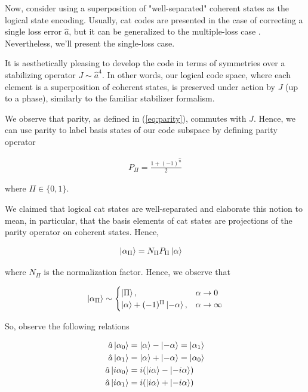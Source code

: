 \documentclass[12]{amsart}
\newcommand\0{\mathbf{0}}
\newcommand\<{\langle}
\renewcommand\>{\rangle}
\begin{document}
Now, consider using a superposition of "well-separated" coherent states as the logical state encoding. Usually, cat codes are presented in the case of correcting a single loss error $\hat{a}$, but it can be generalized to the multiple-loss case \cite{albert2018multimode}. Nevertheless, we'll present the single-loss case.

It is aesthetically pleasing to develop the code in terms of symmetries over a stabilizing operator $J \sim \hat{a}^4$. In other words, our logical code space, where each element is a superposition of coherent states, is preserved under action by $J$ (up to a phase), similarly to the familiar stabilizer formalism.

We observe that parity, as defined in (\ref{eq:parity}), commutes with $J$. Hence, we can use parity to label basis states of our code subspace by defining parity operator

\begin{align*}
P_{\Pi} = \frac{1+(-1)^{\hat{n}}}{2}	
\end{align*}

where $\Pi \in \{0, 1\}$.

We claimed that logical cat states are well-separated and elaborate this notion to mean, in particular, that the basis elements of cat states are projections of the parity operator on coherent states. Hence,

\begin{align*}
\ket{\alpha_\Pi} &= N_\Pi P_\Pi \ket{\alpha}
\end{align*}

where $N_\Pi$ is the normalization factor. Hence, we observe that

\begin{align*}
\ket{\alpha_\Pi} \sim \begin{cases} \ket{\Pi},  &\alpha \rightarrow 0\\ \ket{\alpha} + (-1)^\Pi \ket{-\alpha}, &\alpha \rightarrow \infty \end{cases}
\end{align*}

So, observe the following relations

\begin{align}
\label{eq:cat-rels}
\begin{split}
\hat{a} \ket{\alpha_0} &= \ket{\alpha} - \ket{-\alpha} = \ket{\alpha_1} \\
\hat{a} \ket{\alpha_1} &= \ket{\alpha} + \ket{-\alpha} = \ket{\alpha_0} \\
\hat{a} \ket{i\alpha_0} &= i(\ket{i\alpha} - \ket{-i\alpha})\\
\hat{a} \ket{i\alpha_1} &= i(\ket{i\alpha}  + \ket{-i\alpha})
\end{split}
\end{align}
\end{document}
